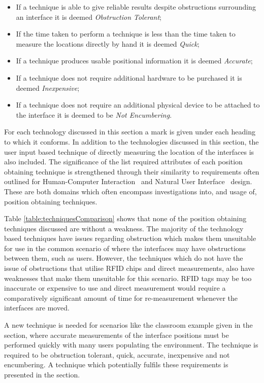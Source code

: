\documentclass{bmcart}
\begin{document}
\begin{itemize}
  \item If a technique is able to give reliable results despite obstructions surrounding an interface it is deemed {\emph{Obstruction Tolerant}};
  \item If the time taken to perform a technique is less than the time taken to measure the locations directly by hand it is deemed {\emph{Quick}};
  \item If a technique produces usable positional information it is deemed {\emph{Accurate}};
  \item If a technique does not require additional hardware to be purchased it is deemed {\emph{Inexpensive}};
  \item If a technique does not require an additional physical device to be attached to the interface it is deemed to be {\emph{Not Encumbering}}.
\end{itemize}

For each technology discussed in this section a mark is given under each heading to which it conforms.
In addition to the technologies discussed in this section, the user input based technique of directly measuring the location of the interfaces is also included.
The significance of the list required attributes of each position obtaining technique is strengthened through their similarity to requirements often outlined for Human-Computer Interaction~\cite{Jacob1993} and Natural User Interface~\cite{Dietz2001} design.
These are both domains which often encompass investigations into, and usage of, position obtaining techniques.

Table \ref{table:techniquesComparison} shows that none of the position obtaining techniques discussed are without a weakness.
The majority of the technology based techniques have issues regarding obstruction which makes them unsuitable for use in the common scenario of where the interfaces may have obstructions between them, such as users.
However, the techniques which do not have the issue of obstructions that utilise RFID chips and direct measurements, also have weaknesses that make them unsuitable for this scenario.
RFID tags may be too inaccurate or expensive to use and direct measurement would require a comparatively significant amount of time for re-measurement whenever the interfaces are moved.

A new technique is needed for scenarios like the classroom example given in the  section, where accurate measurements of the interface positions must be performed quickly with many users populating the environment.
The technique is required to be obstruction tolerant, quick, accurate, inexpensive and not encumbering.
A technique  which potentially fulfils these requirements is presented in the  section.
\end{document}
